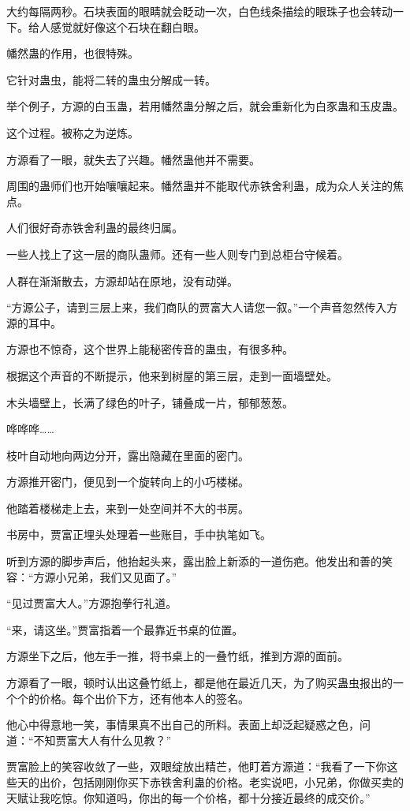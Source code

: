 \begin{this_body}
大约每隔两秒。石块表面的眼睛就会眨动一次，白色线条描绘的眼珠子也会转动一下。给人感觉就好像这个石块在翻白眼。

幡然蛊的作用，也很特殊。

它针对蛊虫，能将二转的蛊虫分解成一转。

举个例子，方源的白玉蛊，若用幡然蛊分解之后，就会重新化为白豕蛊和玉皮蛊。

这个过程。被称之为逆炼。

方源看了一眼，就失去了兴趣。幡然蛊他并不需要。

周围的蛊师们也开始嚷嚷起来。幡然蛊并不能取代赤铁舍利蛊，成为众人关注的焦点。

人们很好奇赤铁舍利蛊的最终归属。

一些人找上了这一层的商队蛊师。还有一些人则专门到总柜台守候着。

人群在渐渐散去，方源却站在原地，没有动弹。

“方源公子，请到三层上来，我们商队的贾富大人请您一叙。”一个声音忽然传入方源的耳中。

方源也不惊奇，这个世界上能秘密传音的蛊虫，有很多种。

根据这个声音的不断提示，他来到树屋的第三层，走到一面墙壁处。

木头墙壁上，长满了绿色的叶子，铺叠成一片，郁郁葱葱。

哗哗哗……

枝叶自动地向两边分开，露出隐藏在里面的密门。

方源推开密门，便见到一个旋转向上的小巧楼梯。

他踏着楼梯走上去，来到一处空间并不大的书房。

书房中，贾富正埋头处理着一些账目，手中执笔如飞。

听到方源的脚步声后，他抬起头来，露出脸上新添的一道伤疤。他发出和善的笑容：“方源小兄弟，我们又见面了。”

“见过贾富大人。”方源抱拳行礼道。

“来，请这坐。”贾富指着一个最靠近书桌的位置。

方源坐下之后，他左手一推，将书桌上的一叠竹纸，推到方源的面前。

方源看了一眼，顿时认出这叠竹纸上，都是他在最近几天，为了购买蛊虫报出的一个个的价格。每个出价下方，还有他本人的签名。

他心中得意地一笑，事情果真不出自己的所料。表面上却泛起疑惑之色，问道：“不知贾富大人有什么见教？”

贾富脸上的笑容收敛了一些，双眼绽放出精芒，他盯着方源道：“我看了一下你这些天的出价，包括刚刚你买下赤铁舍利蛊的价格。老实说吧，小兄弟，你做买卖的天赋让我吃惊。你知道吗，你出的每一个价格，都十分接近最终的成交价。”


\end{this_body}
